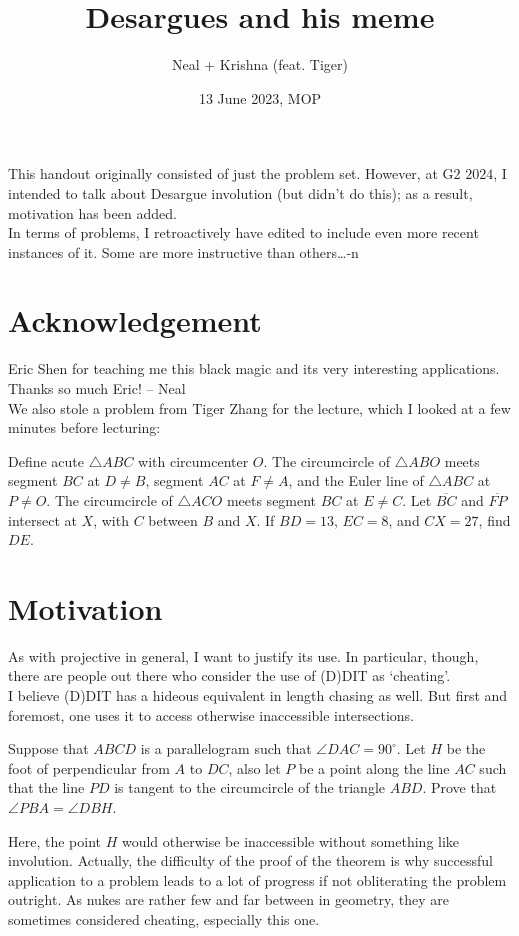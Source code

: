 \documentclass{seto}
\title{Desargues and his meme }
\author{Neal + Krishna (feat. Tiger)}
\date{13 June 2023, MOP}
\begin{document}
\maketitle
\begin{remark}[Note]
    This handout originally consisted of just the problem set.
    However, at G$2$ $2024$, I intended to talk about Desargue involution (but 
    didn't do this); as a result, motivation has been added.\\[4pt]
    In terms of problems, I retroactively have edited to include 
    even more recent instances of it. Some are more instructive than others\dots -n
\end{remark}
\toc
\section{Acknowledgement}
Eric Shen for teaching me this black magic and its very interesting
applications. Thanks so much Eric! -- Neal \\[4pt]
We also stole a problem from Tiger Zhang for the lecture, which I looked at a few minutes before lecturing:
\begin{block}
Define acute $\triangle ABC$ with circumcenter $O$. The circumcircle of
$\triangle ABO$ meets segment $BC$ at $D \ne B$, segment $AC$ at $F \ne A$, and
the Euler line of $\triangle ABC$ at $P \ne O$. The circumcircle of $\triangle
ACO$ meets segment $BC$ at $E \ne C$. Let $\overline{BC}$ and $\overline{FP}$
intersect at $X$, with $C$ between $B$ and $X$. If $BD=13$, $EC=8$, and $CX=27$,
find $DE$.
\end{block}

\section{Motivation}
As with projective in general, I want to justify its use.
In particular, though, there are people 
out there who consider the use of (D)DIT as `cheating'.\\
I believe (D)DIT has a hideous equivalent in length chasing as well.
But first and foremost, one uses it to access otherwise inaccessible intersections.
\begin{block}
Suppose that $ABCD$ is a parallelogram such that $\angle
DAC = 90^\circ$. Let $H$ be the foot of perpendicular from $A$ to $DC$, also let $P$
be a point along the line $AC$ such that the line $PD$ is tangent to the
circumcircle of the triangle $ABD$. Prove that $\angle PBA = \angle DBH$. 
\end{block}
Here, the point $H$ would otherwise be inaccessible without something like involution.
Actually, the difficulty of the proof of the theorem 
is why successful application to a problem leads to
a lot of progress if not obliterating the problem outright. 
As nukes are rather few and far between in geometry, they are sometimes considered cheating,
especially this one.
\end{document}
